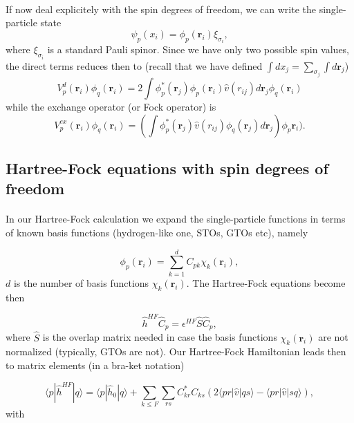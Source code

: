 \documentclass[%
twoside,                 %
final,                   %
10pt]{article}
\begin{document}
\paragraph{}
If now deal explicitely with the spin degrees of freedom, we can write the single-particle state
\[
\psi_{p}(x_i) = \phi_{p}(\mathbf{r}_i)\xi_{\sigma_i},
\]
where $\xi_{\sigma_i}$ is a standard Pauli spinor. Since we have only two possible spin values, the direct terms reduces then to
(recall that we have defined $\int dx_j = \sum_{\sigma_j} \int d \mathbf{r}_j$)
\[
  V_{p}^{d}(\mathbf{r}_i)\phi_{q}(\mathbf{r}_i) = 2\int \phi_{p}^*(\mathbf{r}_j)\phi_{p}(\mathbf{r}_i)\hat{v}(r_{ij}) d\mathbf{r}_j\phi_{q}(\mathbf{r}_i)
\]
while the exchange operator (or Fock operator) is
\[
  V_{p}^{ex}(\mathbf{r}_i) \phi_{q}(\mathbf{r}_i) = \left(\int \phi_{p}^*(\mathbf{r}_j) 
  \hat{v}(r_{ij})\phi_{q}(\mathbf{r}_j)
  d\mathbf{r}_j\right)\phi_{p}\mathbf{r}_i).
\]



\subsection{Hartree-Fock equations with spin degrees of freedom}

\paragraph{}

In our Hartree-Fock calculation we expand the single-particle functions in terms of known basis functions (hydrogen-like one, STOs, GTOs etc), namely

\begin{equation*}
\phi_{p}(\mathbf{r}_i) = \sum_{k=1}^{d}C_{pk}\chi_k(\mathbf{r}_i),
\end{equation*}
$d$ is the number of basis functions $\chi_k(\mathbf{r}_i)$. The Hartree-Fock equations become then

\begin{equation*}
\hat{h}^{HF}\hat{C}_p=\epsilon^{HF}\hat{S}\hat{C}_p,
\end{equation*}
where $\hat{S}$ is the overlap matrix needed in case the basis functions $\chi_k(\mathbf{r}_i)$ are not normalized (typically, GTOs are not). 
Our Hartree-Fock Hamiltonian leads then to matrix elements (in a bra-ket notation)

\[
\langle p | \hat{h}^{HF} | q \rangle = \langle p|\hat{h}_0|q\rangle +\sum_{k\le F}\sum_{rs}C_{kr}^*C_{ks}\left(2\langle pr | \hat{v}|qs\rangle-\langle pr | \hat{v}|sq\rangle\right),
\]
with
\end{document}
